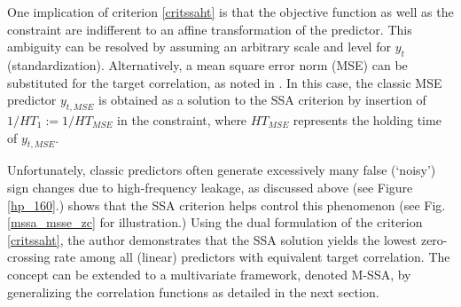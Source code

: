 \documentclass[11pt,a4paper]{article}
\begin{document}
One implication of criterion \eqref{critssaht} is that the objective function as well as the constraint are indifferent to an affine transformation of the predictor. This ambiguity can be resolved by assuming an arbitrary scale and level for $y_t$ (standardization). Alternatively, a mean square error norm (MSE) can be substituted for the target correlation, as noted in \cite{Wildi2025}. In this case, the classic MSE predictor $y_{t,MSE}$ is obtained as a solution to the SSA criterion by insertion of $1/HT_1:=1/HT_{MSE}$ in the constraint, where $HT_{MSE}$ represents the holding time of $y_{t,MSE}$. %

Unfortunately, classic predictors often generate excessively many false (`noisy') sign changes due to high-frequency leakage, as discussed above (see Figure \eqref{hp_160}.)
 \cite{Wildi2025} shows that the SSA criterion helps control this phenomenon (see Fig.\eqref{mssa_msse_zc} for illustration.) Using the dual formulation of the criterion \eqref{critssaht}, the author demonstrates that the SSA solution yields the lowest zero-crossing rate among all (linear) predictors with equivalent target correlation.
The concept can be extended to a multivariate framework, denoted M-SSA, by generalizing the correlation functions as detailed in the next section.\\
\end{document}
